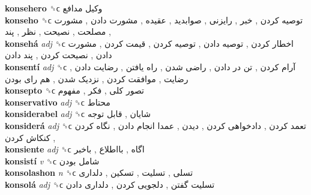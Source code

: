 \textbf{konsehero} ␝ϲ   وکیل مدافع   \\
\textbf{konseho} ␝ϲ   توصیه کردن ,  خبر ,  رایزنی ,  صوابدید ,  عقیده ,  مشورت دادن ,  مشورت ,  مصلحت ,  نصیحت ,  نظر ,  پند   \\
\textbf{konsehá} \emph{adj}  ␝ϲ   اخطار کردن ,  توصیه دادن ,  توصیه کردن ,  قیمت کردن ,  مشورت دادن ,  نصیحت کردن ,  پند دادن   \\
\textbf{konsentí} \emph{adj}  ␝ϲ   آرام کردن ,  تن در دادن ,  راضی شدن ,  راه یافتن ,  رضایت دادن ,  رضایت ,  موافقت کردن ,  نزدیک شدن ,  هم رای بودن   \\
\textbf{konsepto} ␝ϲ   تصور کلی ,  فکر ,  مفهوم   \\
\textbf{konservativo} \emph{adj}  ␝ϲ   محتاط   \\
\textbf{konsiderabel} \emph{adj}  ␝ϲ   شایان ,  قابل توجه   \\
\textbf{konsiderá} \emph{adj}  ␝ϲ   تعمد کردن ,  دادخواهی کردن ,  دیدن ,  عمدا انجام دادن ,  نگاه کردن ,  کنکاش کردن   \\
\textbf{konsiente} \emph{adj}  ␝ϲ   اگاه ,  بااطلاع ,  باخبر   \\
\textbf{konsistí} \emph{v}  ␝ϲ   شامل بودن   \\
\textbf{konsolashon} \emph{n}  ␝ϲ   تسلی ,  تسلیت ,  تسکین ,  دلداری   \\
\textbf{konsolá} \emph{adj}  ␝ϲ   تسلیت گفتن ,  دلجویی کردن ,  دلداری دادن   \\
